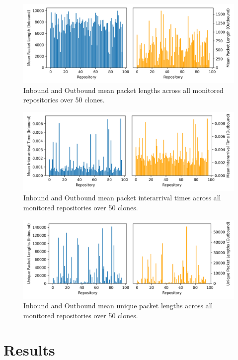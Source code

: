 \documentclass[sigconf,authorversion,nonacm]{acmart}
\begin{document}
\begin{figure}
  \includegraphics[width=\textwidth]{charts/mean-packet-length.png}
  \caption{Inbound and Outbound mean packet lengths across all monitored repositories over 50 clones.}
  \label{fig:packetlen}
\end{figure}

\begin{figure}
  \includegraphics[width=\textwidth]{charts/interarrival-times.png}
  \caption{Inbound and Outbound mean packet interarrival times across all monitored repositories over 50 clones.}
  \label{fig:arrivaltime}
\end{figure}

\begin{figure}
  \includegraphics[width=\textwidth]{charts/unique-packet-lengths.png}
  \caption{Inbound and Outbound mean unique packet lengths across all monitored repositories over 50 clones.}
  \label{fig:uniquepacket}
\end{figure}

\section{Results}
\end{document}
